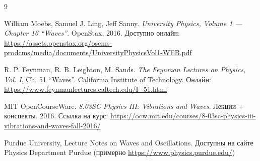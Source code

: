 \begin{thebibliography}{9}

William Moebs, Samuel J. Ling, Jeff Sanny. \textit{University Physics, Volume 1 — Chapter 16 “Waves”}.  
OpenStax, 2016.  
Доступно онлайн: \url{https://assets.openstax.org/oscms-prodcms/media/documents/UniversityPhysicsVol1-WEB.pdf} \cite{openstax-waves}

R. P. Feynman, R. B. Leighton, M. Sands. \textit{The Feynman Lectures on Physics, Vol. I}, Ch. 51 “Waves”.  
California Institute of Technology.  
Онлайн: \url{https://www.feynmanlectures.caltech.edu/I_51.html} \cite{feynman}

MIT OpenCourseWare. \textit{8.03SC Physics III: Vibrations and Waves}.  
Лекции + конспекты. 2016.  
Ссылка на курс: \url{https://ocw.mit.edu/courses/8-03sc-physics-iii-vibrations-and-waves-fall-2016/} \cite{mit803}

Purdue University, Lecture Notes on Waves and Oscillations.  
Доступны на сайте Physics Department Purdue (примерно \url{https://www.physics.purdue.edu/}) \cite{purdue-waves}

\end{thebibliography}
